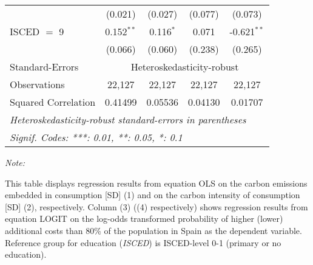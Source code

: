 \begin{table}[htbp!]
\begin{adjustbox}{width = 1\textwidth, max height = 0.95\textheight, center}
\begin{threeparttable}[b]
\begin{tabular}{lcccc}
                                 & (0.021)            & (0.027)            & (0.077)        & (0.073)\\   
            ISCED $=$ 9          & 0.152$^{**}$       & 0.116$^{*}$        & 0.071          & -0.621$^{**}$\\   
                                 & (0.066)            & (0.060)            & (0.238)        & (0.265)\\   
            \midrule 
            Standard-Errors & \multicolumn{4}{c}{Heteroskedasticity-robust} \\ 
            Observations         & 22,127             & 22,127             & 22,127         & 22,127\\  
            Squared Correlation  & 0.41499            & 0.05536            & 0.04130        & 0.01707\\  
            \midrule \midrule
            \multicolumn{5}{l}{\emph{Heteroskedasticity-robust standard-errors in parentheses}}\\
            \multicolumn{5}{l}{\emph{Signif. Codes: ***: 0.01, **: 0.05, *: 0.1}}\\
         \end{tabular}
         
         \begin{tablenotes}\item \medskip \textit{Note:}
            \item This table displays regression results from equation OLS on the carbon emissions embedded in consumption [SD] (1) and on the carbon intensity of consumption [SD] (2), respectively. 
                                      Column (3) ((4) respectively) shows regression results from equation LOGIT on the log-odds transformed probability of higher (lower) additional costs than 80\% of the population in Spain as the dependent variable. Reference group for education (\textit{ISCED}) is ISCED-level 0-1 (primary or no education).
         \end{tablenotes}
      \end{threeparttable}
   \end{adjustbox}
\end{table}


